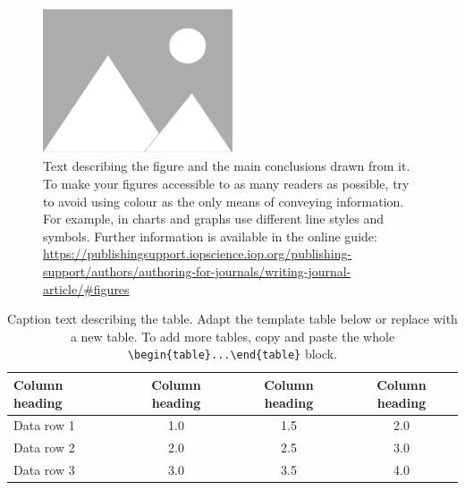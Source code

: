 \documentclass{iopjournal}
\begin{document}
\begin{figure}
 \centering
        \includegraphics[width=0.5\textwidth]{figure1}
 \caption{Text describing the figure and the main conclusions drawn from it. To make your figures accessible to as many readers as possible, try to avoid using colour as the only means of conveying information. For example, in charts and graphs use different line styles and symbols. Further information is available in the online guide: \href{https://publishingsupport.iopscience.iop.org/publishing-support/authors/authoring-for-journals/writing-journal-article/\#figures}{https://publishingsupport.iopscience.iop.org/publishing-support/authors/authoring-for-journals/writing-journal-article/\#figures}}
\label{fig1}
\end{figure}


\begin{table}
\caption{Caption text describing the table. Adapt the template table below or replace with a new table. To add more tables, copy and paste the whole {\tt \textbackslash begin\{table\}...\textbackslash end\{table\}} block.}
\centering
\begin{tabular}{l c c c}
\hline
Column heading & Column heading & Column heading & Column heading \\
\hline
Data row 1 & 1.0 & 1.5 & 2.0 \\
Data row 2 & 2.0 & 2.5 & 3.0 \\
Data row 3 & 3.0 & 3.5 & 4.0 \\
\hline
\end{tabular}
\label{tab1}
\end{table}




%
%
\end{document}
